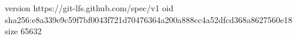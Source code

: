 version https://git-lfs.github.com/spec/v1
oid sha256:e8a339e9c59f7bf0043f721d70476364a200a888cc4a52dfcd368a8627560e18
size 65632
